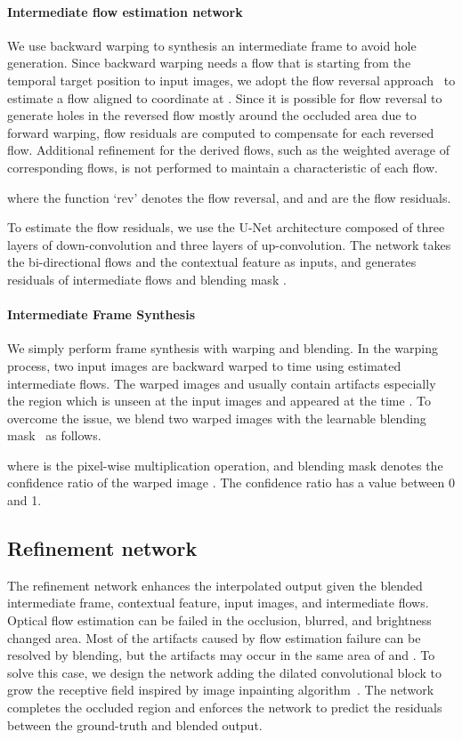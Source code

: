 \documentclass[10pt,twocolumn,letterpaper]{article}
\begin{document}
\paragraph{Intermediate flow estimation network}
We use backward warping to synthesis an intermediate frame to avoid hole generation.
Since backward warping needs a flow that is starting from the temporal target position  to input images, we adopt the flow reversal approach~\cite{xu2019quadratic} to estimate a flow aligned to coordinate at .
Since it is possible for flow reversal to generate holes in the reversed flow mostly around the occluded area due to forward warping, flow residuals are computed to compensate for each reversed flow.
Additional refinement for the derived flows, such as the weighted average of corresponding flows, is not performed to maintain a characteristic of each flow.


where the function `rev' denotes the flow reversal, and  and  are the flow residuals.

To estimate the flow residuals, we use the U-Net architecture composed of three layers of down-convolution and three layers of up-convolution. 
The network takes the bi-directional flows and the contextual feature as inputs, and generates residuals of intermediate flows and blending mask .

\paragraph{Intermediate Frame Synthesis}  
We simply perform frame synthesis with warping and blending. 
In the warping process, two input images are backward warped to time  using estimated intermediate flows. 
The warped images  and  usually contain artifacts especially the region which is unseen at the input images and appeared at the time . 
To overcome the issue, we blend two warped images with the learnable blending mask~ as follows.

where  is the pixel-wise multiplication operation, and blending mask  denotes the confidence ratio of the warped image .
The confidence ratio has a value between 0 and 1.

\subsection{Refinement network}  
The refinement network enhances the interpolated output given the blended intermediate frame, contextual feature, input images, and intermediate flows.
Optical flow estimation can be failed in the occlusion, blurred, and brightness changed area. 
Most of the artifacts caused by flow estimation failure can be resolved by blending, but the artifacts may occur in the same area of  and .
To solve this case, we design the network adding the dilated convolutional block to grow the receptive field inspired by image inpainting algorithm~\cite{iizuka2017globally}. 
The network completes the occluded region and enforces the network to predict the residuals between the ground-truth and blended output.
\end{document}
